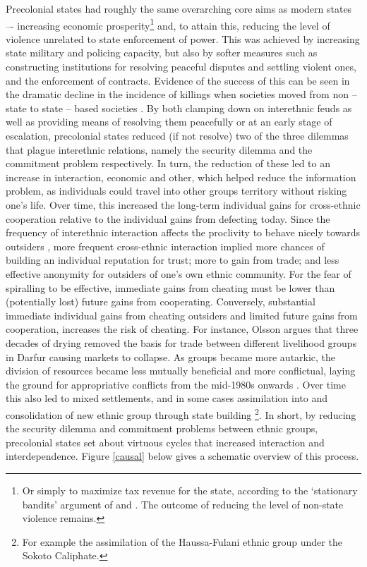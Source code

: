\documentclass[12pt]{article}
\begin{document}
Precolonial states had roughly the same overarching core aims as modern states
–- increasing economic prosperity\footnote{Or simply to maximize tax revenue for
	the state, according to the `stationary bandits' argument of
	\citet{tilly_1985} and \citet{Olson1993}. The outcome of reducing the
level of non-state violence remains.} and, to attain this, reducing the level of
violence unrelated to state enforcement of power. This was achieved by
increasing state military and policing capacity, but also by softer measures
such as constructing institutions for resolving peaceful disputes and settling
violent ones, and the enforcement of contracts. Evidence of the success of this
can be seen in the dramatic decline in the incidence of killings when societies
moved from non -- state to state -- based societies \citep[64ff]{Pinker2012}. By
both clamping down on interethnic feuds as well as providing means of resolving
them peacefully or at an early stage of escalation, precolonial states reduced
(if not resolve) two of the three dilemmas that plague interethnic relations,
namely the security dilemma and the commitment problem respectively. In turn,
the reduction of these led to an increase in interaction, economic and other,
which helped reduce the information problem, as individuals could travel into
other groups territory without risking one’s life. Over time, this increased the
long-term individual gains for cross-ethnic cooperation relative to the
individual gains from defecting today. Since the frequency of interethnic
interaction affects the proclivity to behave nicely towards outsiders
\citep[721]{Fearon_1996}, more frequent cross-ethnic interaction implied more
chances of building an individual reputation for trust; more to gain from trade;
and less effective anonymity for outsiders of one’s own ethnic community. For
the fear of spiralling to be effective, immediate gains from cheating must be
lower than (potentially lost) future gains from cooperating. Conversely,
substantial immediate individual gains from cheating outsiders and limited
future gains from cooperation, increases the risk of cheating. For instance,
Olsson argues that three decades of drying removed the basis for trade between
different livelihood groups in Darfur causing markets to collapse. As groups
became more autarkic, the division of resources became less mutually beneficial
and more conflictual, laying the ground for appropriative conflicts from the
mid-1980s onwards \citep{Olsson2016}. Over time this also led to mixed settlements,
and in some cases assimilation into and consolidation of new ethnic group
through state building \citep{Anderson2006}\footnote{For example the
assimilation of the Haussa-Fulani ethnic group under the Sokoto Caliphate.}. In
short, by reducing the security dilemma and commitment problems between ethnic
groups, precolonial states set about virtuous cycles that increased interaction
and interdependence. Figure \ref{causal} below gives a schematic overview of
this process.
\end{document}
